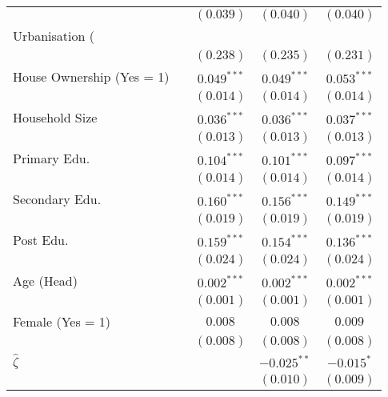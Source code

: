 \begin{table}[htbp]
\begin{center}
\begin{tabular}{l c c c c}
                          &               & $(0.039)$      & $(0.040)$      & $(0.040)$      \\
Urbanisation (\\%
                          &               & $(0.238)$      & $(0.235)$      & $(0.231)$      \\
House Ownership (Yes = 1) &               & $0.049^{***}$  & $0.049^{***}$  & $0.053^{***}$  \\
                          &               & $(0.014)$      & $(0.014)$      & $(0.014)$      \\
Household Size            &               & $0.036^{***}$  & $0.036^{***}$  & $0.037^{***}$  \\
                          &               & $(0.013)$      & $(0.013)$      & $(0.013)$      \\
Primary Edu.              &               & $0.104^{***}$  & $0.101^{***}$  & $0.097^{***}$  \\
                          &               & $(0.014)$      & $(0.014)$      & $(0.014)$      \\
Secondary Edu.            &               & $0.160^{***}$  & $0.156^{***}$  & $0.149^{***}$  \\
                          &               & $(0.019)$      & $(0.019)$      & $(0.019)$      \\
Post Edu.                 &               & $0.159^{***}$  & $0.154^{***}$  & $0.136^{***}$  \\
                          &               & $(0.024)$      & $(0.024)$      & $(0.024)$      \\
Age (Head)                &               & $0.002^{***}$  & $0.002^{***}$  & $0.002^{***}$  \\
                          &               & $(0.001)$      & $(0.001)$      & $(0.001)$      \\
Female (Yes = 1)          &               & $0.008$        & $0.008$        & $0.009$        \\
                          &               & $(0.008)$      & $(0.008)$      & $(0.008)$      \\
$\hat{\zeta}$             &               &                & $-0.025^{**}$  & $-0.015^{*}$   \\
                          &               &                & $(0.010)$      & $(0.009)$      \\

\end{tabular}
\end{center}
\end{table}
